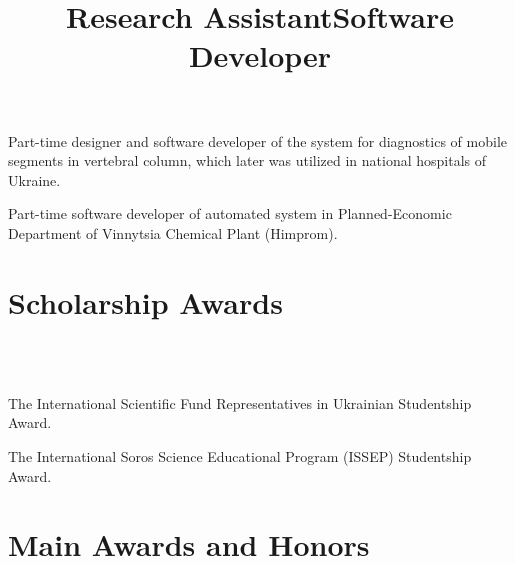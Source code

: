 \documentclass[12pt,overlapped,line]{res}
\begin{document}
\begin{resume}
\begin{position}

 \end{position}

% 

 \title{Research Assistant}
 \begin{position}
 Part-time designer and software developer of the system for
 diagnostics of mobile segments in vertebral column, which later was
 utilized in national hospitals of Ukraine.
 \end{position}

 \title{Software Developer}
 \begin{position}
 Part-time software developer of automated system in
 Planned-Economic Department of Vinnytsia Chemical Plant (Himprom).
 \end{position}

 \section{Scholarship Awards}
 \begin{format}
   \\
   \body\\
 \end{format}

 \employer{}
 \begin{position}
  The International Scientific Fund Representatives in Ukrainian Studentship Award.
 \end{position}

 \employer{}
 \begin{position}
  The International Soros Science Educational Program (ISSEP) Studentship Award.
 \end{position}

 \section{Main Awards and Honors}
 \begin{format}
    \\
   \body\\
 \end{format}


\end{resume}
\end{document}
